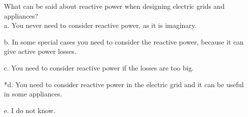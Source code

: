 
What can be said about reactive power when designing electric grids and appliances?\\

a. You never need to consider reactive power, as it is imaginary.

b. In some special cases you need to consider the reactive power, because it can give active power losses.

c. You need to consider reactive power if the losses are too big.

*d. You need to consider reactive power in the electric grid and it can be useful in some appliances.

e. I do not know.\\
